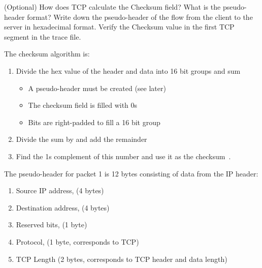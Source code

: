 \begin{Question}
	(Optional) How does TCP calculate the Checksum field? What is the pseudo-header format? Write down the pseudo-header of the flow from the client to the server in hexadecimal format. Verify the Checksum value in the first TCP segment in the trace file.
\end{Question}
\begin{Answer}
	The checksum algorithm is:
	\begin{enumerate}
		\item Divide the hex value of the header and data into 16 bit groups and sum
			\begin{itemize}
				\item A pseudo-header must be created (see later)
				\item The checksum field is filled with 0s
				\item Bits are right-padded to fill a 16 bit group
			\end{itemize}
		\item Divide the sum by  and add the remainder
		\item Find the 1s complement of this number and use it as the checksum~\cite{tcp-checksum}.
	\end{enumerate}
	The pseudo-header for packet 1 is 12 bytes consisting of data from the IP header:
	\begin{enumerate}
		\item Source IP address,  (4 bytes)
		\item Destination address,  (4 bytes)
		\item Reserved bits,  (1 byte)
		\item Protocol,  (1 byte, corresponds to TCP)
		\item TCP Length  (2 bytes, corresponds to TCP header and data length)~\cite{tcp-checksum}
	\end{enumerate}
\end{Answer}

